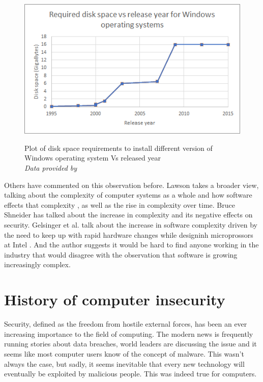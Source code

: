 \begin{figure} \begin{center}
\label{win_year_size_plot}
\includegraphics[width=0.8\linewidth]{pics/windows_year_size_plot} 
\end{center} 
\caption{Plot of disk space requirements to install different version of Windows operating system Vs released year\\ \textit{\small{Data provided by \cite{comp_win}}}}
\end{figure}

Others have commented on this observation before. Lawson takes a broader view, talking about the complexity of computer systems as a whole and how software effects that complexity \cite{lawson}, as well as the rise in complexity over time. Bruce Shneider has talked about the increase in complexity and its negative effects on security. Gelsinger et al. talk about the increase in software complexity driven by the need to keep up with rapid hardware changes while designinh microprossors at Intel \cite{gelsinger}. And the author suggests it would be hard to find anyone working in the industry that would disagree with the observation that software is growing increasingly complex.\\

\section{History of computer insecurity}
Security, defined as the freedom from hostile external forces, has been an ever increasing importance to the field of computing. The modern news is frequently running stories about data breaches, world leaders are discussing the issue and it seems like most computer users know of the concept of malware. This wasn't always the case, but sadly, it seems inevitable that every new technology will eventually be exploited by malicious people. This was indeed true for computers. \\\\

